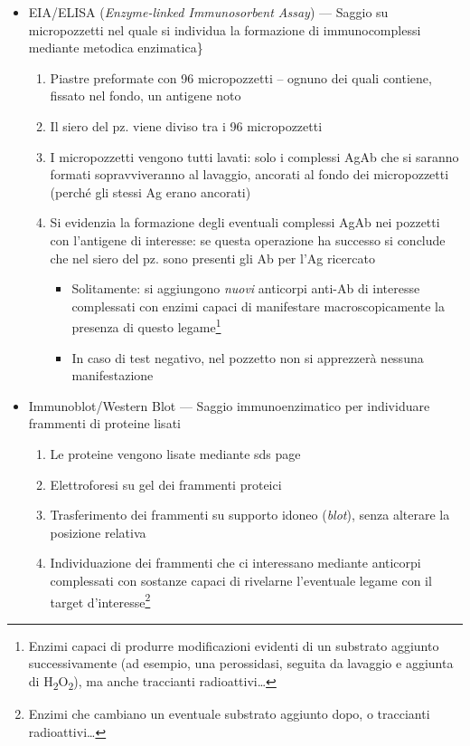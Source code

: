 \documentclass[italian,]{article}
\providecommand{\tightlist}{%
  \setlength{\itemsep}{0pt}\setlength{\parskip}{0pt}}
\begin{document}
\begin{itemize}
\tightlist
\item
  EIA/ELISA (\emph{Enzyme-linked Immunosorbent Assay}) --- Saggio su
  micropozzetti nel quale si individua la formazione di immunocomplessi
  mediante metodica enzimatica\}

  \begin{enumerate}
  \def\labelenumi{\arabic{enumi}.}
  \tightlist
  \item
    Piastre preformate con 96 micropozzetti -- ognuno dei quali
    contiene, fissato nel fondo, un antigene noto
  \item
    Il siero del pz. viene diviso tra i 96 micropozzetti
  \item
    I micropozzetti vengono tutti lavati: solo i complessi AgAb che si
    saranno formati sopravviveranno al lavaggio, ancorati al fondo dei
    micropozzetti (perché gli stessi Ag erano ancorati)
  \item
    Si evidenzia la formazione degli eventuali complessi AgAb nei
    pozzetti con l'antigene di interesse: se questa operazione ha
    successo si conclude che nel siero del pz. sono presenti gli Ab per
    l'Ag ricercato

    \begin{itemize}
    \tightlist
    \item
      Solitamente: si aggiungono \emph{nuovi} anticorpi anti-Ab di
      interesse complessati con enzimi capaci di manifestare
      macroscopicamente la presenza di questo legame\footnote{Enzimi
        capaci di produrre modificazioni evidenti di un substrato
        aggiunto successivamente (ad esempio, una perossidasi, seguita
        da lavaggio e aggiunta di H\textsubscript{2}O\textsubscript{2}),
        ma anche traccianti radioattivi\ldots{}}
    \item
      In caso di test negativo, nel pozzetto non si apprezzerà nessuna
      manifestazione
    \end{itemize}
  \end{enumerate}
\item
  Immunoblot/Western Blot --- Saggio immunoenzimatico per individuare
  frammenti di proteine lisati

  \begin{enumerate}
  \def\labelenumi{\arabic{enumi}.}
  \tightlist
  \item
    Le proteine vengono lisate mediante sds page
  \item
    Elettroforesi su gel dei frammenti proteici
  \item
    Trasferimento dei frammenti su supporto idoneo (\emph{blot}), senza
    alterare la posizione relativa
  \item
    Individuazione dei frammenti che ci interessano mediante anticorpi
    complessati con sostanze capaci di rivelarne l'eventuale legame con
    il target d'interesse\footnote{Enzimi che cambiano un eventuale
      substrato aggiunto dopo, o traccianti radioattivi\ldots{}}
  \end{enumerate}
\end{itemize}
\end{document}
